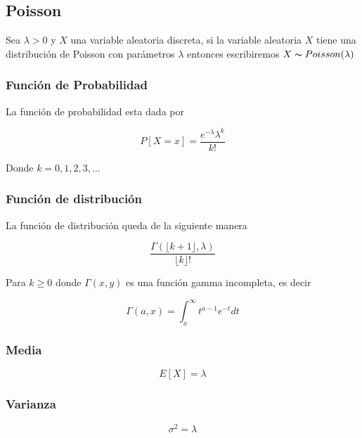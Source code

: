 \documentclass{article}
\begin{document}
        \subsection{Poisson}

            Sea $\lambda > 0$ y $X$ una variable aleatoria discreta, si la variable aleatoria $X$ tiene una distribución de Poisson con parámetros $\lambda$ entonces escribiremos $X\thicksim Poisson (\lambda)$ 

                \subsubsection{Función de Probabilidad}

                    La función de probabilidad esta dada por

                        \begin{equation*}
                            P[X=x]=\frac{e^{-\lambda}\lambda ^k}{k!}
                        \end{equation*}

                    Donde $k=0,1,2,3,\ldots$

                \subsubsection{Función de distribución }

                    La función de distribución queda de la siguiente manera

                        \begin{equation*}
                            \frac{\Gamma (\lfloor k+1 \rfloor ,\lambda )}{ \lfloor k \rfloor!}
                        \end{equation*}

                    Para $k \geq 0$ donde $\Gamma (x,y)$ es una función gamma incompleta, es decir

                        \begin{equation*}
                            \Gamma (a,x) = \int _x^{\infty} t^{a-1}e^{-t} dt
                        \end{equation*}

                \subsubsection{Media}

                            \begin{equation*}
                                E[X] = \lambda
                            \end{equation*}
                
                \subsubsection{Varianza}

                    \begin{equation*}
                        \sigma ^2 = \lambda
                    \end{equation*}
                
\end{document}
